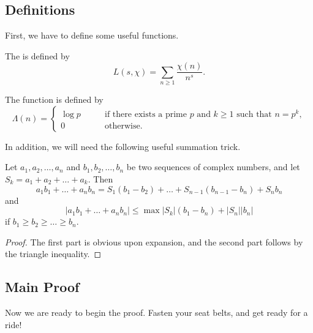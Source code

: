 \documentclass{scrartcl}
\begin{document}
\subsection{Definitions}

First, we have to define some useful functions. 

\begin{definition}
	The  is defined by 
	$$L(s, \chi) = \sum_{n\ge 1} \frac{\chi(n)}{n^s}.$$
\end{definition}

\begin{definition}
	The  function is defined by
	$$\Lambda(n) = \begin{cases}
	\log p & \qquad \text{if there exists a prime }p \text{ and } k\ge 1 \text{ such that } n=p^k, \\
	0 & \qquad \text{otherwise}. 
	\end{cases}$$
\end{definition}

In addition, we will need the following useful summation trick. 

\begin{theorem}
	Let $a_1, a_2, \dots, a_n$ and $b_1, b_2, \dots, b_n$ be two sequences of complex numbers, 
	and let $S_k = a_1+a_2+\dots+a_k$. 
	Then $$a_1b_1+\dots+a_nb_n = S_1(b_1-b_2)+\dots+S_{n-1}(b_{n-1}-b_n)+S_nb_n$$
	and 
	$$|a_1b_1+\dots+a_nb_n| \le \max |S_k| (b_1-b_n)+|S_n||b_n|$$
	if $b_1\ge b_2\ge \dots \ge b_n$.
\end{theorem}

\begin{proof}
	The first part is obvious upon expansion, and the second part follows by the triangle inequality. 
\end{proof}

\subsection{Main Proof}

Now we are ready to begin the proof. Fasten your seat belts, and get ready for a ride!
\end{document}
